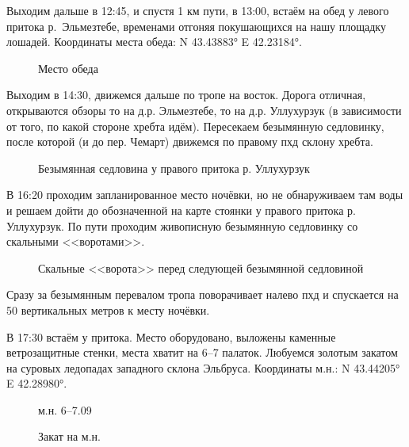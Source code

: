 Выходим дальше в 12:45, и спустя 1 км пути, в 13:00, встаём на обед у левого притока р.~Эльмезтебе, временами отгоняя покушающихся на нашу площадку лошадей. Координаты места обеда: N 43.43883° E 42.23184°.

\begin{figure}[h!]
	\centering
	\caption{Место обеда}
	\label{fig:06_dinner}
\end{figure}

Выходим в 14:30, движемся дальше по тропе на восток. Дорога отличная, открываются обзоры то на д.р. Эльмезтебе, то на д.р. Уллухурзук (в зависимости от того, по какой стороне хребта идём). Пересекаем безымянную седловинку, после которой (и до пер. Чемарт) движемся по правому пхд склону хребта.

\begin{figure}[h!]
	\centering
	\caption{Безымянная седловина у правого притока р. Уллухурзук}
	\label{fig:saddle}
\end{figure}


В 16:20 проходим запланированное место ночёвки, но не обнаруживаем там воды и решаем дойти до обозначенной на карте стоянки у правого притока р. Уллухурзук. По пути проходим живописную безымянную седловинку со скальными <<воротами>>.

\begin{figure}[h!]
	\centering
	\caption{Скальные <<ворота>> перед следующей безымянной седловиной}
	\label{fig:gate}
\end{figure}
 
Сразу за безымянным перевалом тропа поворачивает налево пхд и спускается на 50 вертикальных метров к месту ночёвки.

В 17:30 встаём у притока. Место оборудовано, выложены каменные ветрозащитные стенки, места хватит на 6--7 палаток. Любуемся золотым закатом на суровых ледопадах западного склона Эльбруса. Координаты м.н.: N 43.44205° E 42.28980°.

\begin{figure}[h!]
	\centering
	\caption{м.н. 6--7.09}
	\label{fig:camp06_1}
\end{figure}


\begin{figure}[h!]
	\centering
	\caption{Закат на м.н.}
	\label{fig:camp06}
\end{figure}

\clearpage